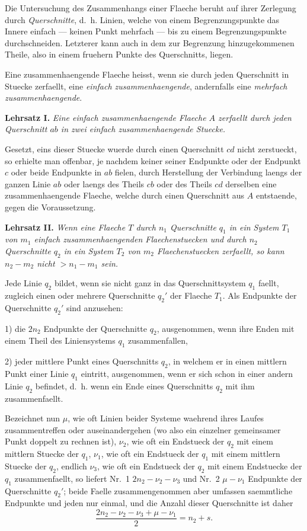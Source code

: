 \documentclass[11pt,a4paper]{article}
\theoremstyle{plain}
\theoremstyle{definition}
\begin{document}
Die Untersuchung des Zusammenhangs einer Flaeche beruht auf ihrer Zerlegung durch \emph{Querschnitte}, d.\ h. Linien, welche von einem Begrenzungspunkte das Innere einfach --- keinen Punkt mehrfach --- bis zu einem Begrenzungspunkte durchschneiden. Letzterer kann auch in dem zur Begrenzung hinzugekommenen Theile, also in einem fruehern Punkte des Querschnitts, liegen.

Eine zusammenhaengende Flaeche heisst, wenn sie durch jeden Querschnitt in Stuecke zerfaellt, eine \emph{einfach zusammenhaengende}, andernfalls eine \emph{mehrfach zusammenhaengende}.

\textbf{Lehrsatz I.} \emph{Eine einfach zusammenhaengende Flaeche $A$ zerfaellt durch jeden Querschnitt $ab$ in zwei einfach zusammenhaengende Stuecke.}

Gesetzt, eins dieser Stuecke wuerde durch einen Querschnitt $cd$ nicht zerstueckt, so erhielte man offenbar, je nachdem keiner seiner Endpunkte oder der Endpunkt $c$ oder beide Endpunkte in $ab$ fielen, durch Herstellung der Verbindung laengs der ganzen Linie $ab$ oder laengs des Theils $cb$ oder des Theils $cd$ derselben eine zusammenhaengende Flaeche, welche durch einen Querschnitt aus $A$ entstaende, gegen die Voraussetzung.

\textbf{Lehrsatz II.} \emph{Wenn eine Flaeche $T$ durch $n_1$ Querschnitte $q_1$ in ein System $T_1$ von $m_1$ einfach zusammenhaengenden Flaechenstuecken und durch $n_2$ Querschnitte $q_2$ in ein System $T_2$ von $m_2$ Flaechenstuecken zerfaellt, so kann $n_2 - m_2$ nicht $> n_1 - m_1$ sein.}

Jede Linie $q_2$ bildet, wenn sie nicht ganz in das Querschnittsystem $q_1$ faellt, zugleich einen oder mehrere Querschnitte $q_2'$ der Flaeche $T_1$. Als Endpunkte der Querschnitte $q_2'$ sind anzusehen:

1) die $2n_2$ Endpunkte der Querschnitte $q_2$, ausgenommen, wenn ihre Enden mit einem Theil des Liniensystems $q_1$ zusammenfallen,

2) jeder mittlere Punkt eines Querschnitts $q_2$, in welchem er in einen mittlern Punkt einer Linie $q_1$ eintritt, ausgenommen, wenn er sich schon in einer andern Linie $q_2$ befindet, d.\ h. wenn ein Ende eines Querschnitts $q_2$ mit ihm zusammenfaellt.

Bezeichnet nun $\mu$, wie oft Linien beider Systeme waehrend ihres Laufes zusammentreffen oder auseinandergehen (wo also ein einzelner gemeinsamer Punkt doppelt zu rechnen ist), $\nu_2$, wie oft ein Endstueck der $q_2$ mit einem mittlern Stuecke der $q_1$, $\nu_1$, wie oft ein Endstueck der $q_1$ mit einem mittlern Stuecke der $q_2$, endlich $\nu_3$, wie oft ein Endstueck der $q_2$ mit einem Endstuecke der $q_1$ zusammenfaellt, so liefert Nr.\ 1 $2n_2 - \nu_2 - \nu_3$ und Nr.\ 2 $\mu - \nu_1$ Endpunkte der Querschnitte $q_2'$; beide Faelle zusammengenommen aber umfassen saemmtliche Endpunkte und jeden nur einmal, und die Anzahl dieser Querschnitte ist daher
\[
\frac{2n_2 - \nu_2 - \nu_3 + \mu - \nu_1}{2} = n_2 + s.
\]
\end{document}
